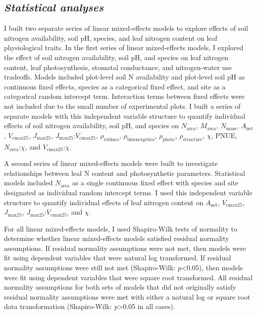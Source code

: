 \subsection{\textit{Statistical analyses}}
\noindent I built two separate series of linear mixed-effects models to explore effects of soil nitrogen availability, soil pH, species, and leaf nitrogen content on leaf physiological traits. In the first series of linear mixed-effects models, I explored the effect of soil nitrogen availability, soil pH, and species on leaf nitrogen content, leaf photosynthesis, stomatal conductance, and nitrogen-water use tradeoffs. Models included plot-level soil N availability and plot-level soil pH as continuous fixed effects, species as a categorical fixed effect, and site as a categorical random intercept term. Interaction terms between fixed effects were not included due to the small number of experimental plots. I built a series of separate models with this independent variable structure to quantify individual effects of soil nitrogen availability, soil pH, and species on $N_\mathrm{area}$, $M_\mathrm{area}$, $N_\mathrm{mass}$, $A_\mathrm{net}$, $V_\mathrm{cmax25}$, $J_\mathrm{max25}$, $J_\mathrm{max25}$:$V_\mathrm{cmax25}$, $\rho_\mathrm{rubisco}$, $\rho_\mathrm{bioenergetics}$, $\rho_\mathrm{photo}$, $\rho_\mathrm{structure}$, $\chi$, PNUE, $N_\mathrm{area}$:$\chi$, and $V_\mathrm{cmax25}$:$\chi$.

A second series of linear mixed-effects models were built to investigate relationships between leaf N content and photosynthetic parameters. Statistical models included $N_\mathrm{area}$ as a single continuous fixed effect with species and site designated as individual random intercept terms. I used this independent variable structure to quantify individual effects of leaf nitrogen content on $A_\mathrm{net}$, $V_\mathrm{cmax25}$, $J_\mathrm{max25}$, $J_\mathrm{max25}$:$V_\mathrm{cmax25}$, and $\chi$.

For all linear mixed-effects models, I used Shapiro-Wilk tests of normality to determine whether linear mixed-effects models satisfied residual normality assumptions. If residual normality assumptions were not met, then models were fit using dependent variables that were natural log transformed. If residual normality assumptions were still not met (Shapiro-Wilk: \textit{p}<0.05), then models were fit using dependent variables that were square root transformed. All residual normality assumptions for both sets of models that did not originally satisfy residual normality assumptions were met with either a natural log or square root data transformation (Shapiro-Wilk: \textit{p}>0.05 in all cases).

